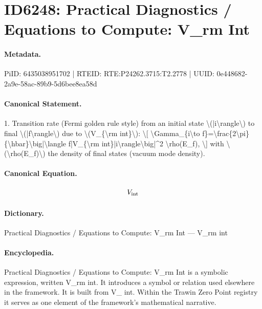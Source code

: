 \section*{ID6248: Practical Diagnostics / Equations to Compute: V\_rm Int}
\paragraph{Metadata.}
PiID: 6435038951702 | RTEID: RTE:P24262.3715:T2.2778 | UUID: 0e448682-2a9e-58ac-89b9-5d6bee8ea58d

\paragraph{Canonical Statement.}
1. Transition rate (Fermi golden rule style) from an initial state \textbackslash{}(|i\textbackslash{}rangle\textbackslash{}) to final \textbackslash{}(|f\textbackslash{}rangle\textbackslash{}) due to \textbackslash{}(V\_\{\textbackslash{}rm int\}\textbackslash{}): \textbackslash{}[ \textbackslash{}Gamma\_\{i\textbackslash{}to f\}=\textbackslash{}frac\{2\textbackslash{}pi\}\{\textbackslash{}hbar\}\textbackslash{}big|\textbackslash{}langle f|V\_\{\textbackslash{}rm int\}|i\textbackslash{}rangle\textbackslash{}big|\textasciicircum{}2 \textbackslash{}rho(E\_f), \textbackslash{}] with \textbackslash{}(\textbackslash{}rho(E\_f)\textbackslash{}) the density of final states (vacuum mode density).

\paragraph{Canonical Equation.}
\[
V_{\rm int}
\]

\paragraph{Dictionary.}
Practical Diagnostics / Equations to Compute: V\_rm Int — V\_rm int

\paragraph{Encyclopedia.}
Practical Diagnostics / Equations to Compute: V\_rm Int is a symbolic expression, written V\_rm int. It introduces a symbol or relation used elsewhere in the framework. It is built from V\_ int. Within the Trawin Zero Point registry it serves as one element of the framework's mathematical narrative.
